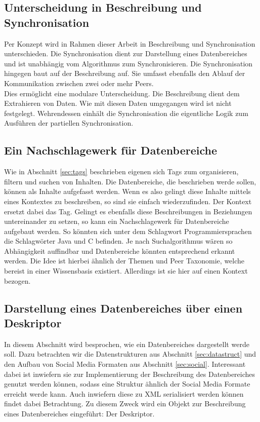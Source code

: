 \documentclass[a4paper]{article}
\begin{document}
	\subsection{Unterscheidung in Beschreibung und Synchronisation}
	
	Per Konzept wird in Rahmen dieser Arbeit in Beschreibung und Synchronisation
	unterschieden. Die Synchronisation dient zur Darstellung eines Datenbereiches
	und ist unabhängig vom Algorithmus zum Synchronisieren. Die Synchronisation
	hingegen baut auf der Beschreibung auf. Sie  umfasst ebenfalls den Ablauf
	der Kommunikation zwischen zwei oder mehr Peers. \\
	
	Dies ermöglicht eine modulare Unterscheidung. Die Beschreibung dient  
	dem Extrahieren von Daten. Wie mit diesen Daten umgegangen wird ist nicht
	festgelegt. Wehrendessen einhält die Synchronisation die eigentliche Logik zum
	Ausführen der partiellen Synchronisation. 	
	
	\subsection{Ein Nachschlagewerk für Datenbereiche}
	
	Wie in Abschnitt \ref{sec:tags} beschrieben eigenen sich Tags zum organisieren,
	filtern und suchen von Inhalten. Die Datenbereiche, die beschrieben werde sollen,
	können als Inhalte aufgefasst werden. Wenn es also gelingt diese Inhalte mittels
	eines Kontextes zu beschreiben, so sind sie einfach wiederzufinden. Der Kontext
	ersetzt dabei das Tag. Gelingt es ebenfalls diese Beschreibungen in Beziehungen
	untereinander zu setzen, so kann ein Nachschlagewerk für Datenbereiche aufgebaut
	werden. So könnten sich unter dem Schlagwort Programmiersprachen die Schlagwörter
	Java und C befinden. Je nach Suchalgorithmus wären so Abhängigkeit auffindbar
	und Datenbereiche könnten entsprechend erkannt werden. Die Idee ist hierbei
	ähnlich der Themen und Peer Taxonomie, welche bereist in einer Wissensbasis
	existiert. Allerdings ist sie hier auf einen Kontext bezogen.
	
	\subsection{Darstellung eines Datenbereiches über einen Deskriptor}
	
	In diesem Abschnitt wird besprochen, wie ein Datenbereiches dargestellt werde
	soll. Dazu betrachten wir die Datenstrukturen aus Abschnitt
	\ref{sec:datastruct} und den Aufbau von Social Media Formaten aus Abschnitt
	\ref{sec:social}. Interessant dabei ist inwiefern sie zur Implementierung der
	Beschreibung des Datenbereiches genutzt werden können, sodass eine Struktur
	ähnlich der Social Media Formate erreicht werde kann. Auch inwiefern
	diese zu XML serialisiert werden können findet dabei Betrachtung. Zu diesem
	Zweck wird ein Objekt zur Beschreibung eines Datenbereiches eingeführt: Der
	Deskriptor. 
	
\end{document}
